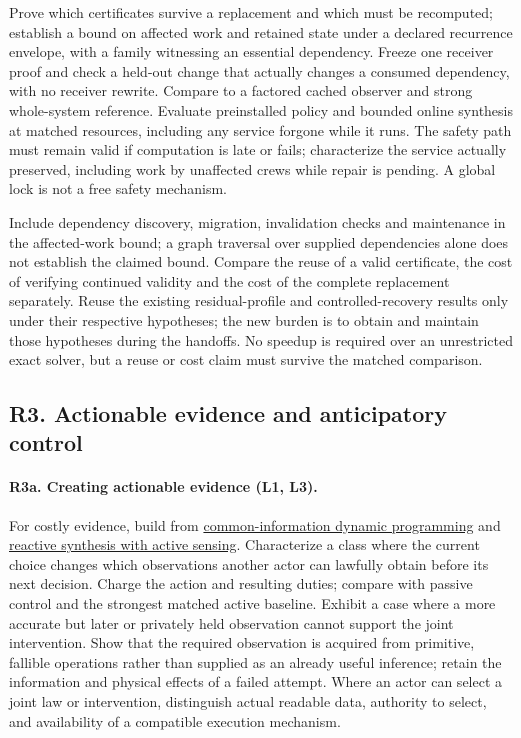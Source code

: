 \documentclass[11pt]{article}
\begin{document}
Prove which certificates survive a replacement and which must be recomputed; establish a bound on affected work and retained state under a declared recurrence envelope, with a family witnessing an essential dependency. Freeze one receiver proof and check a held-out change that actually changes a consumed dependency, with no receiver rewrite. Compare to a factored cached observer and strong whole-system reference. Evaluate preinstalled policy and bounded online synthesis at matched resources, including any service forgone while it runs. The safety path must remain valid if computation is late or fails; characterize the service actually preserved, including work by unaffected crews while repair is pending. A global lock is not a free safety mechanism.

Include dependency discovery, migration, invalidation checks and maintenance in the affected-work bound; a graph traversal over supplied dependencies alone does not establish the claimed bound. Compare the reuse of a valid certificate, the cost of verifying continued validity and the cost of the complete replacement separately. Reuse the existing residual-profile and controlled-recovery results only under their respective hypotheses; the new burden is to obtain and maintain those hypotheses during the handoffs. No speedup is required over an unrestricted exact solver, but a reuse or cost claim must survive the matched comparison.

\subsection*{R3. Actionable evidence and anticipatory control}
\paragraph{R3a. Creating actionable evidence (L1, L3).} For costly evidence, build from \href{https://arxiv.org/abs/1209.1695}{common-information dynamic programming} and \href{https://arxiv.org/abs/1410.0083}{reactive synthesis with active sensing}. Characterize a class where the current choice changes which observations another actor can lawfully obtain before its next decision. Charge the action and resulting duties; compare with passive control and the strongest matched active baseline. Exhibit a case where a more accurate but later or privately held observation cannot support the joint intervention. Show that the required observation is acquired from primitive, fallible operations rather than supplied as an already useful inference; retain the information and physical effects of a failed attempt. Where an actor can select a joint law or intervention, distinguish actual readable data, authority to select, and availability of a compatible execution mechanism.
\end{document}
